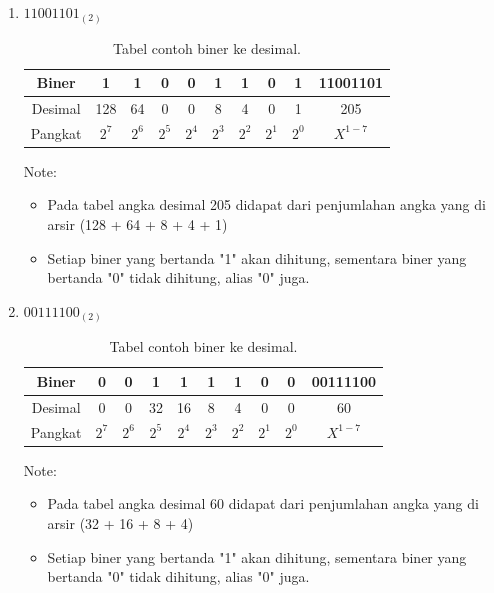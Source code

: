 \begin{enumerate}[label=(\alph*)]
\item $11001101_{(2)}$

\begin{table}[h!]
\centering
\begin{tabular}{ |c|c|c|c|c|c|c|c|c|c| }
\hline
Biner & 1 & 1 & 0 & 0 & 1 & 1 & 0 & 1 & 11001101 \\
\hline
Desimal & 128 & 64 & 0 & 0 & 8 & 4 & 0 & 1 & 205 \\
\hline
Pangkat & $2^7$ & $2^6$ & $2^5$ & $2^4$ & $2^3$ & $2^2$ & $2^1$ & $2^0$ & $X^{1-7}$ \\
\hline
\end{tabular}
\caption{Tabel contoh biner ke desimal.}
\label{table:contoh2}
\end{table}

Note:
\begin{itemize}
\item Pada tabel angka desimal 205 didapat dari penjumlahan angka yang di arsir (128 + 64 + 8 + 4 + 1)
\item Setiap biner yang bertanda "1" akan dihitung, sementara biner yang bertanda "0" tidak dihitung, alias "0" juga.
\end{itemize}

\item $00111100_{(2)}$

\begin{table}[h!]
\centering
\begin{tabular}{ |c|c|c|c|c|c|c|c|c|c| }
\hline
Biner & 0 & 0 & 1 & 1 & 1 & 1 & 0 & 0 & 00111100 \\
\hline
Desimal & 0 & 0 & 32 & 16 & 8 & 4 & 0 & 0 & 60 \\
\hline
Pangkat & $2^7$ & $2^6$ & $2^5$ & $2^4$ & $2^3$ & $2^2$ & $2^1$ & $2^0$ & $X^{1-7}$ \\
\hline
\end{tabular}
\caption{Tabel contoh biner ke desimal.}
\label{table:contoh3}
\end{table}

Note:
\begin{itemize}
\item Pada tabel angka desimal 60 didapat dari penjumlahan angka yang di arsir (32 + 16 + 8 + 4)
\item Setiap biner yang bertanda "1" akan dihitung, sementara biner yang bertanda "0" tidak dihitung, alias "0" juga.
\end{itemize}


\end{enumerate}
